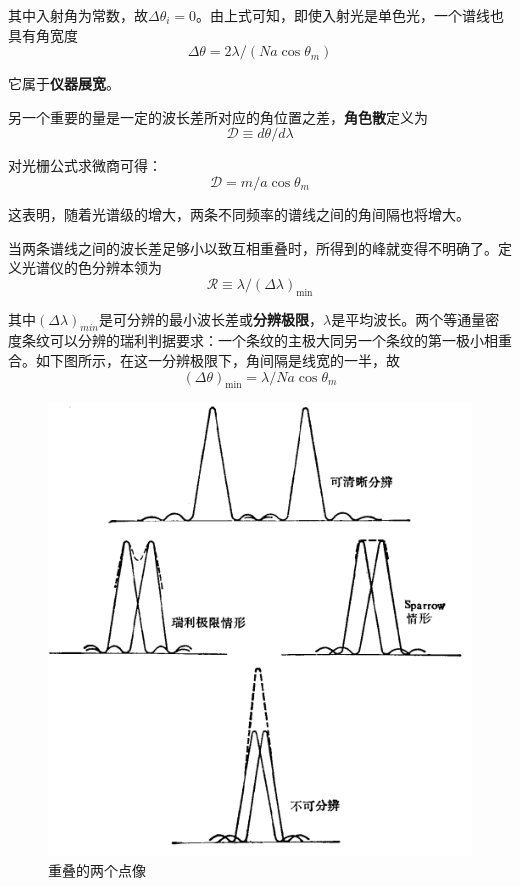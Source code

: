 \documentclass[UTF8]{ctexart}
\begin{document}
\noindent 其中入射角为常数，故$ \Delta \theta_{i}=0 $。由上式可知，即使入射光是单色光，一个谱线也具有角宽度
\begin{equation}
\Delta \theta=2 \lambda /\left(N a \cos \theta_{m}\right)
\end{equation}

\noindent 它属于\textbf{仪器展宽}。

	另一个重要的量是一定的波长差所对应的角位置之差，\textbf{角色散}定义为
	\begin{equation}
	\mathscr{D} \equiv d \theta / d \lambda
	\end{equation}
	
\noindent 对光栅公式求微商可得：
\begin{equation}
\mathscr{D}=m / a \cos \theta_{m}
\end{equation}

\noindent 这表明，随着光谱级的增大，两条不同频率的谱线之间的角间隔也将增大。

	当两条谱线之间的波长差足够小以致互相重叠时，所得到的峰就变得不明确了。定义光谱仪的色分辨本领为
	\begin{equation}
	\mathscr{R} \equiv \lambda /(\Delta \lambda)_{\min }
	\end{equation}
	
\noindent 其中$ (\Delta \lambda)_{min} $是可分辨的最小波长差或\textbf{分辨极限}，$ \lambda $是平均波长。两个等通量密度条纹可以分辨的瑞利判据要求：一个条纹的主极大同另一个条纹的第一极小相重合。如下图所示，在这一分辨极限下，角间隔是线宽的一半，故
\begin{equation}
(\Delta \theta)_{\min }=\lambda / N a \cos \theta_{m}
\end{equation}

	\begin{figure}[ht]
		\centering
		\includegraphics[width=12cm]{Diffraction_judge.png}
		\caption{重叠的两个点像}
		\label{figure_judge}
	\end{figure}
\end{document}
